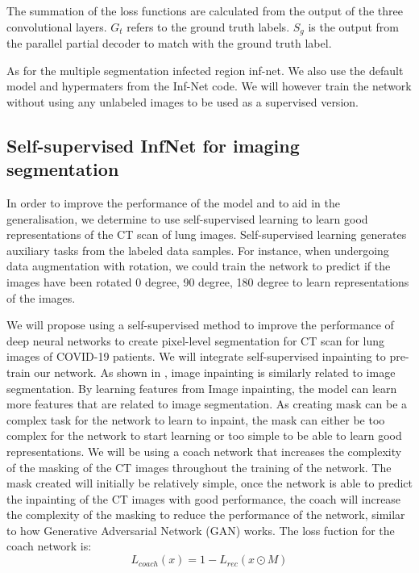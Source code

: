 The summation of the loss functions are calculated from the output of the three convolutional layers. $G_t$ refers to the ground truth labels. $S_g$ is the output from the parallel partial decoder to match with the ground truth label.

As for the multiple segmentation infected region inf-net. We also use the default model and hypermaters from the Inf-Net code. We will however train the network without using any unlabeled images to be used as a supervised version.

\subsection{Self-supervised InfNet for imaging segmentation}
In order to improve the performance of the model and to aid in the generalisation, we  determine to use self-supervised learning to learn good representations of the CT scan of lung images. Self-supervised learning generates auxiliary tasks from the labeled data samples. For instance, when undergoing data augmentation with rotation, we could train the network to predict if the images have been rotated 0 degree, 90 degree, 180 degree to learn representations of the images. 

We will propose using a self-supervised method to improve the performance of deep neural networks to create pixel-level segmentation for CT scan for lung images of COVID-19 patients. We will integrate self-supervised inpainting to pre-train our network. As shown in \cite{ref25}, image inpainting is similarly related to image segmentation. By learning features from Image inpainting, the model can learn more features that are related to image segmentation. As creating mask can be a complex task for the network to learn to inpaint, the mask can either be too complex for the network to start learning or too simple to be able to learn good representations. We will be using a coach network\cite{ref25} that increases the complexity of the masking of the CT images throughout the training of the network. The mask created will initially be relatively simple, once the network is able to predict the inpainting of the CT images with good performance, the coach will increase the complexity of the masking to reduce the performance of the network, similar to how Generative Adversarial Network (GAN) \cite{ref20} works. The loss fuction for the coach network is:
\begin{equation}
L_{coach}(x) = 1 - L_{rec}(x\odot M)
\end{equation}

